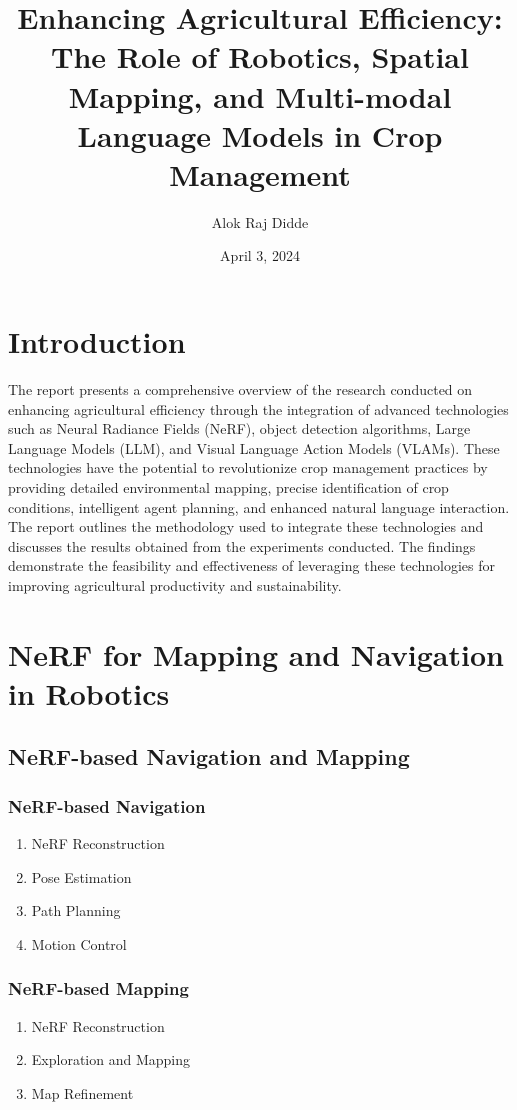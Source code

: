 \documentclass[12pt]{report}
\title{Enhancing Agricultural Efficiency: The Role of Robotics, Spatial Mapping, and Multi-modal Language Models in Crop Management}
\author{Alok Raj Didde}
\date{April 3, 2024}
\begin{document}
\maketitle

\tableofcontents

\chapter{Introduction}
The report presents a comprehensive overview of the research conducted on enhancing agricultural efficiency through the integration of advanced technologies such as Neural Radiance Fields (NeRF), object detection algorithms, Large Language Models (LLM), and Visual Language Action Models (VLAMs). These technologies have the potential to revolutionize crop management practices by providing detailed environmental mapping, precise identification of crop conditions, intelligent agent planning, and enhanced natural language interaction. The report outlines the methodology used to integrate these technologies and discusses the results obtained from the experiments conducted. The findings demonstrate the feasibility and effectiveness of leveraging these technologies for improving agricultural productivity and sustainability.

\chapter{NeRF for Mapping and Navigation in Robotics}
\section{NeRF-based Navigation and Mapping}
\subsection{NeRF-based Navigation}
\begin{enumerate}
    \item NeRF Reconstruction
    \item Pose Estimation
    \item Path Planning
    \item Motion Control
\end{enumerate}

\subsection{NeRF-based Mapping}
\begin{enumerate}
    \item NeRF Reconstruction
    \item Exploration and Mapping
    \item Map Refinement
\end{enumerate}
\end{document}
